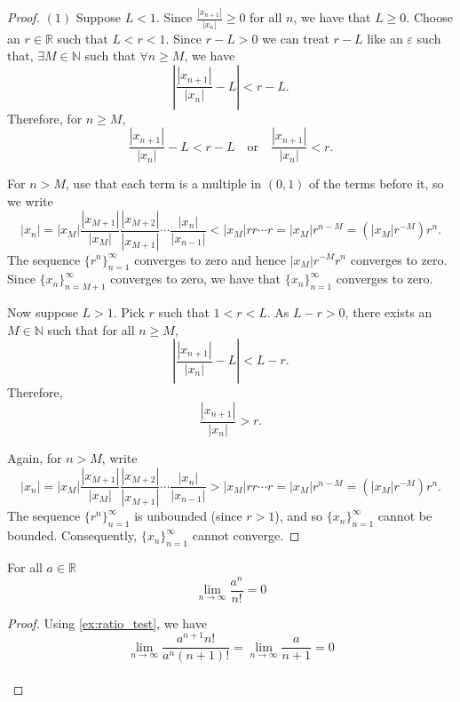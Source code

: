 \documentclass[../main.tex]{subfiles}
\begin{document}
    \begin{proof}
    \( (1) \) Suppose \( L < 1 \). Since \( \frac{|x_{n+1}|}{|x_n|} \geq 0 \) for all \( n \), we have that \( L \geq 0 \). Choose an \(r \in \mathbb{R}\) such that \( L < r < 1.\) Since \(r - L > 0\) we can treat \( r - L\) like an \( \varepsilon\) such that, \( \exists M \in \mathbb{N}\) such that \( \forall n \geq M\), we have
    \[
    \left| \frac{|x_{n+1}|}{|x_n|} - L \right| < r - L.
    \]
    Therefore, for \( n \geq M \),
    \[
    \frac{|x_{n+1}|}{|x_n|} - L < r - L \quad \text{or} \quad \frac{|x_{n+1}|}{|x_n|} < r.
    \]
    
    For \( n > M \), use that each term is a multiple in \((0,1)\) of the terms before it, so we write
    \[
    |x_n| = |x_M| \frac{|x_{M+1}|}{|x_M|} \frac{|x_{M+2}|}{|x_{M+1}|} \cdots \frac{|x_n|}{|x_{n-1}|} < |x_M| r r \cdots r = |x_M| r^{n-M} = (|x_M| r^{-M}) r^n.
    \]
    The sequence \( \{r^n\}_{n=1}^{\infty} \) converges to zero and hence \( |x_M| r^{-M} r^n \) converges to zero. Since \( \{x_n\}_{n=M+1}^{\infty} \) converges to zero, we have that \( \{x_n\}_{n=1}^{\infty} \) converges to zero.
    
    Now suppose \( L > 1 \). Pick \( r \) such that \( 1 < r < L \). As \( L - r > 0 \), there exists an \( M \in \mathbb{N} \) such that for all \( n \geq M \),
    \[
    \left| \frac{|x_{n+1}|}{|x_n|} - L \right| < L - r.
    \]
    Therefore,
    \[
    \frac{|x_{n+1}|}{|x_n|} > r.
    \]
    
    Again, for \( n > M \), write
    \[
    |x_n| = |x_M| \frac{|x_{M+1}|}{|x_M|} \frac{|x_{M+2}|}{|x_{M+1}|} \cdots \frac{|x_n|}{|x_{n-1}|} > |x_M| r r \cdots r = |x_M| r^{n-M} = (|x_M| r^{-M}) r^n.
    \]
    The sequence \( \{r^n\}_{n=1}^{\infty} \) is unbounded (since \( r > 1 \)), and so \( \{x_n\}_{n=1}^{\infty} \) cannot be bounded. Consequently, \( \{x_n\}_{n=1}^{\infty} \) cannot converge.   
    \end{proof}
    
    
    
    
    
    
    
    
    
    
    \begin{exercise}\label{ex: factorial and exponential growth}
    For all \( a \in \mathbb{R} \)
    \[
    \lim_{n \to \infty} \frac{a^n}{n!} = 0 
    \]
    \end{exercise}
    
    
    \begin{proof}
    Using \ref{ex:ratio_test}, we have
    \[
    \lim_{n\to\infty}{\frac{a^{n+1}n!}{a^n(n+1)!}} = \lim_{n\to\infty}{\frac{a}{n+1}} = 0
    \]\\
    \end{proof}
    
\end{document}
